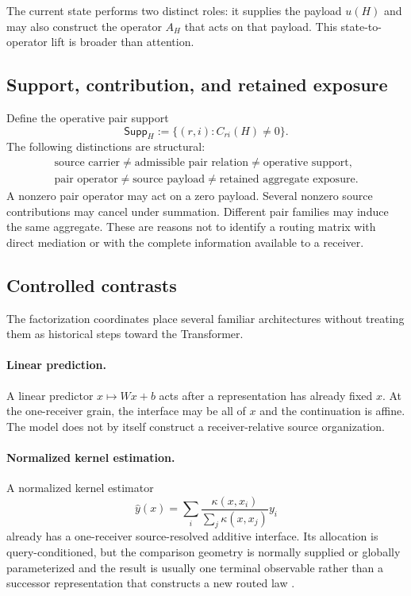 The current state performs two distinct roles: it supplies the payload $u(H)$ and may also construct the operator $A_H$ that acts on that payload. This state-to-operator lift is broader than attention.

\subsection{Support, contribution, and retained exposure}

Define the operative pair support
\[
\mathsf{Supp}_H:=\{(r,i):C_{ri}(H)\neq0\}.
\]
The following distinctions are structural:
\[
\boxed{
\begin{gathered}
\text{source carrier}
\neq
\text{admissible pair relation}
\neq
\text{operative support},\\
\text{pair operator}
\neq
\text{source payload}
\neq
\text{retained aggregate exposure}.
\end{gathered}}
\]
A nonzero pair operator may act on a zero payload. Several nonzero source contributions may cancel under summation. Different pair families may induce the same aggregate. These are reasons not to identify a routing matrix with direct mediation or with the complete information available to a receiver.

\subsection{Controlled contrasts}

The factorization coordinates place several familiar architectures without treating them as historical steps toward the Transformer.

\paragraph{Linear prediction.}
A linear predictor $x\mapsto Wx+b$ acts after a representation has already fixed $x$. At the one-receiver grain, the interface may be all of $x$ and the continuation is affine. The model does not by itself construct a receiver-relative source organization.

\paragraph{Normalized kernel estimation.}
A normalized kernel estimator
\[
\widehat y(x)
=
\sum_i
\frac{\kappa(x,x_i)}{\sum_j\kappa(x,x_j)}y_i
\]
already has a one-receiver source-resolved additive interface. Its allocation is query-conditioned, but the comparison geometry is normally supplied or globally parameterized and the result is usually one terminal observable rather than a successor representation that constructs a new routed law \citep{nadaraya1964estimating,watson1964smooth}.

